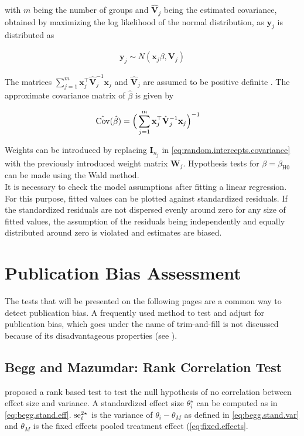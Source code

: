 \documentclass[11pt,a4paper,twoside]{book}\usepackage[]{graphicx}\usepackage[]{color}
\begin{document}
with $m$ being the number of groups and $\hat{\mathbf{V}}_j$ being the estimated covariance, obtained by maximizing the log likelihood of the normal distribution, as $\mathbf{y}_j$ is distributed as

\begin{align}
\mathbf{y}_j \sim N(\mathbf{x}_j \beta, \mathbf{V}_j)
\end{align}

The matrices $\sum_{j = 1}^m \mathbf{x}_j^\top \hat{\mathbf{V}}_j^{-1} \mathbf{x}_j$ and $\hat{\mathbf{V}}_j$ are assumed to be positive definite  . The approximate covariance matrix of $\hat{\beta}$ is given by

\begin{align}
\hat{\operatorname{Cov}}(\hat{\beta}) &= \Big( \sum_{j = 1}^m \mathbf{x}_j^\top \hat{\mathbf{V}}_j^{-1} \mathbf{x}_j \Big)^{-1}
\end{align}

Weights can be introduced by replacing $\mathbf{I}_{n_j}$ in \eqref{eq:random.intercepts.covariance} with the previously introduced weight matrix $\mathbf{W}_j$. Hypothesis tests for $\beta = \beta_\textrm{H0}$ can be made using the Wald method. \\
It is necessary to check the model assumptions after fitting a linear regression. For this purpose, fitted values can be plotted against standardized residuals. If the standardized residuals are not dispersed evenly around zero for any size of fitted values, the assumption of the residuals being independently and equally distributed around zero is violated and estimates are biased. \\










\section{Publication Bias Assessment}
The tests that will be presented on the following pages are a common way to detect publication bias. A frequently used method to test and adjust for publication bias, which goes under the name of trim-and-fill \citep{trimfill} is not discussed because of its disadvantageous properties (see \eg \citealp{Moreno.2009}).\\

\subsection{Begg and Mazumdar: Rank Correlation Test} \label{sec:Begg}
\citealp{Begg} proposed a rank based test to test the null hypothesis of no correlation between effect size and variance.
A standardized effect size $\theta_i^\star$ can be computed as in \eqref{eq:begg.stand.eff}. $\operatorname{se}_i^{2\star}$ is the variance of $\theta_i - \theta_M$ as defined in \eqref{eq:begg.stand.var} and $\theta_M$ is the fixed effects pooled treatment effect (\eqref{eq:fixed.effects}. 
\end{document}
